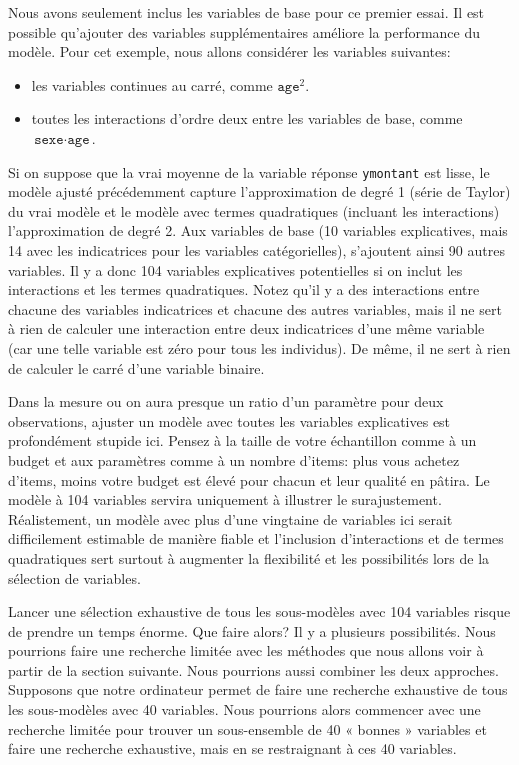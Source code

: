 \documentclass[
  11pt,
  letterpaper,
]{book}
\providecommand{\tightlist}{%
  \setlength{\itemsep}{0pt}\setlength{\parskip}{0pt}}
\theoremstyle{definition}
\theoremstyle{definition}
\theoremstyle{definition}
\theoremstyle{definition}
\theoremstyle{remark}
\begin{document}
Nous avons seulement inclus les variables de base pour ce premier essai. Il est possible qu'ajouter des variables supplémentaires améliore la performance du modèle. Pour cet exemple, nous allons considérer les variables suivantes:

\begin{itemize}
\tightlist
\item
  les variables continues au carré, comme \(\texttt{age}^2\).
\item
  toutes les interactions d'ordre deux entre les variables de base, comme \(\texttt{sexe}\cdot\texttt{age}\).
\end{itemize}

Si on suppose que la vrai moyenne de la variable réponse \texttt{ymontant} est lisse, le modèle ajusté précédemment capture l'approximation de degré 1 (série de Taylor) du vrai modèle et le modèle avec termes quadratiques (incluant les interactions) l'approximation de degré 2. Aux variables de base (10 variables explicatives, mais 14 avec les indicatrices pour les variables catégorielles), s'ajoutent ainsi 90 autres variables. Il y a donc 104 variables explicatives potentielles si on inclut les interactions et les termes quadratiques. Notez qu'il y a des interactions entre chacune des variables indicatrices et chacune des autres variables, mais il ne sert à rien de calculer une interaction entre deux indicatrices d'une même variable (car une telle variable est zéro pour tous les individus). De même, il ne sert à rien de calculer le carré d'une variable binaire.

Dans la mesure ou on aura presque un ratio d'un paramètre pour deux observations, ajuster un modèle avec toutes les variables explicatives est profondément stupide ici. Pensez à la taille de votre échantillon comme à un budget et aux paramètres comme à un nombre d'items: plus vous achetez d'items, moins votre budget est élevé pour chacun et leur qualité en pâtira. Le modèle à 104 variables servira uniquement à illustrer le surajustement. Réalistement, un modèle avec plus d'une vingtaine de variables ici serait difficilement estimable de manière fiable et l'inclusion d'interactions et de termes quadratiques sert surtout à augmenter la flexibilité et les possibilités lors de la sélection de variables.

Lancer une sélection exhaustive de tous les sous-modèles avec 104 variables risque de prendre un temps énorme. Que faire alors? Il y a plusieurs possibilités. Nous pourrions faire une recherche limitée avec les méthodes que nous allons voir à partir de la section suivante. Nous pourrions aussi combiner les deux approches. Supposons que notre ordinateur permet de faire une recherche exhaustive de tous les sous-modèles avec 40 variables. Nous pourrions alors commencer avec une recherche limitée pour trouver un sous-ensemble de 40 « bonnes » variables et faire une recherche exhaustive, mais en se restraignant à ces 40 variables.
\end{document}
